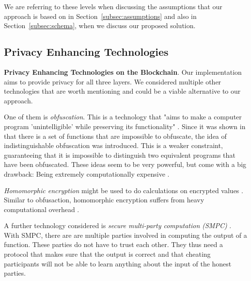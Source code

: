 \documentclass[runningheads]{llncs}
\newcommand{\refsec}[1]{Section~\ref{#1}}
\begin{document}
We are referring to these levels when discussing the assumptions that our approach is based on in \refsec{subsec:assumptions} and also in \refsec{subsec:schema}, when we discuss our proposed solution. 






\subsection{Privacy Enhancing Technologies} \label{subsec:technologies}

\textbf{Privacy Enhancing Technologies on the Blockchain}. Our implementation aims to provide privacy for all three layers. We considered multiple other technologies that are  worth mentioning and could be a viable alternative to our approach. 

One of them is \textit{obfuscation}. This is a technology that "aims to make a computer program 'unintelligible' while preserving its functionality" \cite{garg2016candidate}. Since it was shown in \cite{barak2001possibility,barak2012possibility} that there is a set of functions that are impossible to obfuscate, the idea of indistinguishable obfuscation was introduced. This is a weaker constraint, guaranteeing that it is impossible to distinguish two equivalent programs that have been obfuscated. These ideas seem to be very powerful, but come with a big drawback: Being extremely computationally expensive \cite{banescu2015idea}. 

\textit{Homomorphic encryption} might be used to do calculations on encrypted values . Similar to obfusaction, homomorphic encryption suffers from heavy computational overhead .


A further technology considered is \textit{secure multi-party computation (SMPC)} \cite{orlandi2011multiparty}. With SMPC, there are are multiple parties involved in computing the output of a function. These parties do not have to trust each other. They thus need a protocol that makes sure that the output is correct and that cheating participants will not be able to learn anything about the input of the honest parties. 
\end{document}
